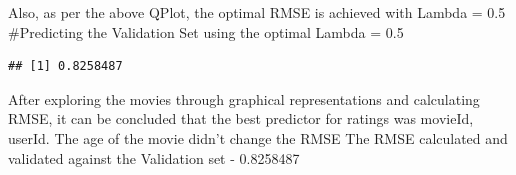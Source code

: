 \documentclass[
]{article}
\newenvironment{Shaded}{\begin{snugshade}}{\end{snugshade}}
\newcommand{\DataTypeTok}[1]{\textcolor[rgb]{0.13,0.29,0.53}{#1}}
\newcommand{\KeywordTok}[1]{\textcolor[rgb]{0.13,0.29,0.53}{\textbf{#1}}}
\newcommand{\NormalTok}[1]{#1}
\newcommand{\OperatorTok}[1]{\textcolor[rgb]{0.81,0.36,0.00}{\textbf{#1}}}
\newcommand{\StringTok}[1]{\textcolor[rgb]{0.31,0.60,0.02}{#1}}
\begin{document}
Also, as per the above QPlot, the optimal RMSE is achieved with Lambda =
0.5 \#Predicting the Validation Set using the optimal Lambda = 0.5

\begin{Shaded}
\end{Shaded}

\begin{verbatim}
## [1] 0.8258487
\end{verbatim}

After exploring the movies through graphical representations and
calculating RMSE, it can be concluded that the best predictor for
ratings was movieId, userId. The age of the movie didn't change the RMSE
The RMSE calculated and validated against the Validation set - 0.8258487
\end{document}

